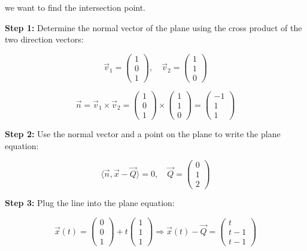 we want to find the intersection point.

\textbf{Step 1:} Determine the normal vector of the plane using the cross product of the two direction vectors:

\[
	\vec{v}_1 = \begin{pmatrix} 1 \\ 0 \\ 1 \end{pmatrix}, \quad \vec{v}_2 = \begin{pmatrix} 1 \\ 1 \\ 0 \end{pmatrix}
\]

\[
	\vec{n} = \vec{v}_1 \times \vec{v}_2 =
	\begin{pmatrix} 1 \\ 0 \\ 1 \end{pmatrix} \times \begin{pmatrix} 1 \\ 1 \\ 0 \end{pmatrix} =
	\begin{pmatrix} -1 \\ 1 \\ 1 \end{pmatrix}
\]

\textbf{Step 2:} Use the normal vector and a point on the plane to write the plane equation:

\[
	\langle \vec{n}, \vec{x} - \vec{Q} \rangle = 0, \quad \vec{Q} = \begin{pmatrix} 0 \\ 1 \\ 2 \end{pmatrix}
\]

\textbf{Step 3:} Plug the line into the plane equation:

\[
	\vec{x}(t) = \begin{pmatrix} 0 \\ 0 \\ 1 \end{pmatrix} + t \begin{pmatrix} 1 \\ 1 \\ 1 \end{pmatrix}
	\Rightarrow
	\vec{x}(t) - \vec{Q} =
	\begin{pmatrix} t \\ t - 1 \\ t - 1 \end{pmatrix}
\]

